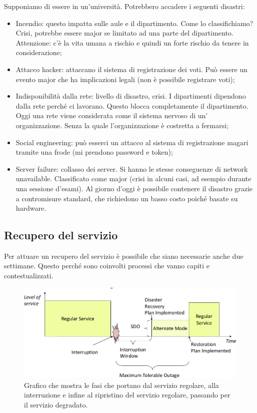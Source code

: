 Supponiamo di essere in un'università.
Potrebbero accadere i seguenti disastri:
\begin{itemize}
 \item Incendio: questo impatta sulle aule e il dipartimento. Come lo
classifichiamo? Crisi, potrebbe essere major se limitato ad una parte del
dipartimento. Attenzione: c'è la vita umana a rischio e quindi un forte
rischio da tenere in considerazione;

 \item Attacco hacker: attaccano il sistema di registrazione dei voti. Può essere un
evento major che ha implicazioni legali (non è possibile registrare voti);

 \item Indisponibilità dalla rete: livello di disastro, crisi. I dipartimenti dipendono dalla rete perché
ci lavorano. Questo blocca completamente il dipartimento. Oggi una rete viene
considerata come il sistema nervoso di un' organizzazione. Senza la quale
l'organizzazione è costretta a fermarsi;

 \item Social engineering: può esserci un attacco al sistema di registrazione magari tramite una frode
(mi prendono password e token);

 \item Server failure: collasso dei server. Si hanno le stesse conseguenze di network unavailable.
Classificato come major (crisi in alcuni casi, ad esempio durante una sessione
d'esami). Al giorno d'oggi è possibile contenere il disastro grazie a
contromisure
standard, che richiedono un basso costo poiché basate su hardware.
\end{itemize}

\subsection{Recupero del servizio}

Per attuare un recupero del servizio è possibile che siano necessarie anche due
settimane.
Questo perché sono coinvolti processi che vanno capiti e contestualizzati.

\begin{figure}[h!]
        \begin{center}
                \includegraphics[scale=0.65]{res/img/recovery-times.png}
        \end{center}
        \caption{Grafico che mostra le fasi che portano dal servizio 
        regolare, alla interruzione e infine al ripristino del servizio 
        regolare, passando per il servizio degradato.}
\end{figure}

